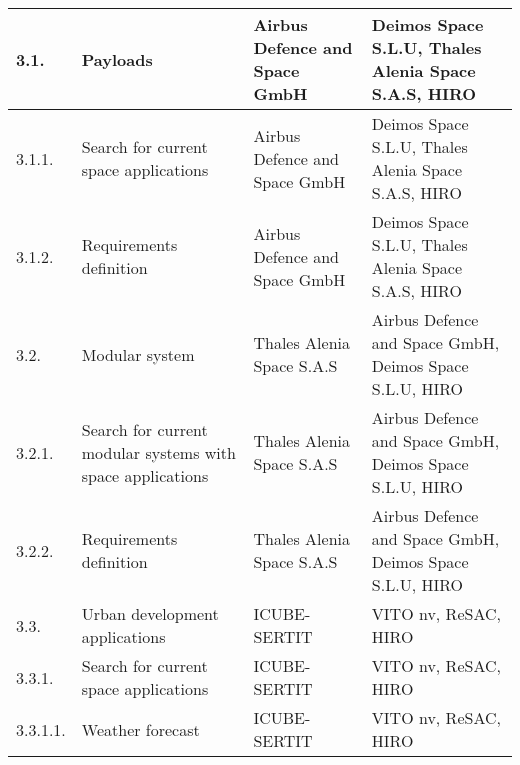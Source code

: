 \begin{longtable}[H]{p{1.5cm} >{\raggedright\arraybackslash}p{4cm} >{\raggedright\arraybackslash}p{3.8cm} >{\raggedright\arraybackslash}p{4cm}}
	\midrule
	
	3.1. & Payloads & Airbus Defence and Space GmbH & Deimos Space S.L.U, Thales Alenia Space S.A.S, HIRO\vspace{0.2cm} \\
	
	\midrule
	
	3.1.1. & Search for current space applications & Airbus Defence and Space GmbH & Deimos Space S.L.U, Thales Alenia Space S.A.S, HIRO\vspace{0.2cm} \\
	
	\midrule
	
	3.1.2. & Requirements definition & Airbus Defence and Space GmbH & Deimos Space S.L.U, Thales Alenia Space S.A.S, HIRO\vspace{0.2cm} \\
	
	\midrule
	
	3.2. & Modular system & Thales Alenia Space S.A.S & Airbus Defence and Space GmbH, Deimos Space S.L.U, HIRO\vspace{0.2cm} \\
	
	\midrule
	
	3.2.1. & Search for current modular systems with space applications & Thales Alenia Space S.A.S & Airbus Defence and Space GmbH, Deimos Space S.L.U, HIRO\vspace{0.2cm} \\
	
	\midrule
	
	3.2.2. & Requirements definition&Thales Alenia Space S.A.S & Airbus Defence and Space GmbH, Deimos Space S.L.U, HIRO\vspace{0.2cm} \\
	
	\midrule
	
	3.3. & Urban development applications & ICUBE-SERTIT & VITO nv, ReSAC, HIRO\vspace{0.2cm} \\
	
	\midrule
	
	3.3.1. & Search for current space applications & ICUBE-SERTIT & VITO nv, ReSAC, HIRO\vspace{0.2cm} \\
	
	\midrule
	
	3.3.1.1. & Weather forecast & ICUBE-SERTIT & VITO nv, ReSAC, HIRO\vspace{0.2cm} \\
	

\end{longtable}
